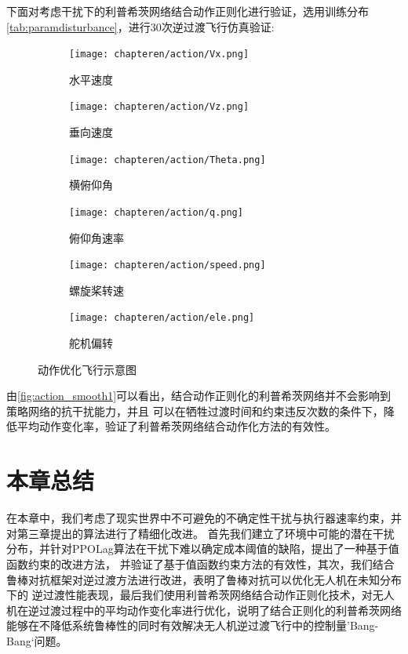 下面对考虑干扰下的利普希茨网络结合动作正则化进行验证，选用训练分布\autoref{tab:paramdisturbance}，进行30次逆过渡飞行仿真验证:
\begin{figure}[H]
    \centering
    \begin{subfigure}{.46\textwidth}
        \centering
        \texttt{[image: chapteren/action/Vx.png]}
        \caption{水平速度}
        \label{fig:sub1}
    \end{subfigure}%
    \begin{subfigure}{.46\textwidth}
        \centering
        \texttt{[image: chapteren/action/Vz.png]}
        \caption{垂向速度}
        \label{fig:sub2}
    \end{subfigure}
    \begin{subfigure}{.46\textwidth}
        \centering
        \texttt{[image: chapteren/action/Theta.png]}
        \caption{横俯仰角}
        \label{fig:sub3}
    \end{subfigure}%
    \begin{subfigure}{.46\textwidth}
        \centering
        \texttt{[image: chapteren/action/q.png]}
        \caption{俯仰角速率}
        \label{fig:sub4}
    \end{subfigure}
    \begin{subfigure}{.46\textwidth}
        \centering
        \texttt{[image: chapteren/action/speed.png]}
        \caption{螺旋桨转速}
        \label{fig:sub5}
    \end{subfigure}%
    \begin{subfigure}{.46\textwidth}
        \centering
        \texttt{[image: chapteren/action/ele.png]}
        \caption{舵机偏转}
        \label{fig:sub6}
    \end{subfigure}
    \caption{动作优化飞行示意图}
    \label{fig:action_smooth1}
\end{figure}
由\autoref{fig:action_smooth1}可以看出，结合动作正则化的利普希茨网络并不会影响到策略网络的抗干扰能力，并且
可以在牺牲过渡时间和约束违反次数的条件下，降低平均动作变化率，验证了利普希茨网络结合动作化方法的有效性。
\section{本章总结}
在本章中，我们考虑了现实世界中不可避免的不确定性干扰与执行器速率约束，并对第三章提出的算法进行了精细化改进。
首先我们建立了环境中可能的潜在干扰分布，并针对PPOLag算法在干扰下难以确定成本阈值的缺陷，提出了一种基于值函数约束的改进方法，
并验证了基于值函数约束方法的有效性，其次，我们结合鲁棒对抗框架对逆过渡方法进行改进，表明了鲁棒对抗可以优化无人机在未知分布下的
逆过渡性能表现，最后我们使用利普希茨网络结合动作正则化技术，对无人机在逆过渡过程中的平均动作变化率进行优化，说明了结合正则化的利普希茨网络
能够在不降低系统鲁棒性的同时有效解决无人机逆过渡飞行中的控制量’Bang-Bang‘问题。


